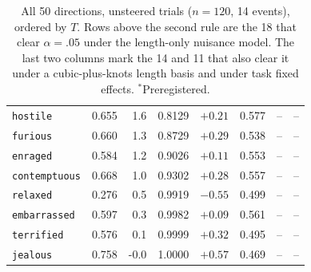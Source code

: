 \begin{table}[h]
\begin{tabular}{@{}lrrrrrcc@{}}
\texttt{hostile} & 0.655 & 1.6 & 0.8129 & $+0.21$ & 0.577 & -- & -- \\
\texttt{furious} & 0.660 & 1.3 & 0.8729 & $+0.29$ & 0.538 & -- & -- \\
\texttt{enraged} & 0.584 & 1.2 & 0.9026 & $+0.11$ & 0.553 & -- & -- \\
\texttt{contemptuous} & 0.668 & 1.0 & 0.9302 & $+0.28$ & 0.557 & -- & -- \\
\texttt{relaxed} & 0.276 & 0.5 & 0.9919 & $-0.55$ & 0.499 & -- & -- \\
\texttt{embarrassed} & 0.597 & 0.3 & 0.9982 & $+0.09$ & 0.561 & -- & -- \\
\texttt{terrified} & 0.576 & 0.1 & 0.9999 & $+0.32$ & 0.495 & -- & -- \\
\texttt{jealous} & 0.758 & -0.0 & 1.0000 & $+0.57$ & 0.469 & -- & -- \\
\bottomrule
\end{tabular}
\caption{All 50 directions, unsteered trials ($n = 120$, 14 events), ordered by $T$. Rows above the second rule are the 18 that clear $\alpha = .05$ under the length-only nuisance model. The last two columns mark the 14 and 11 that also clear it under a cubic-plus-knots length basis and under task fixed effects. $^*$Preregistered.}
\label{tab:appdirs}
\end{table}
